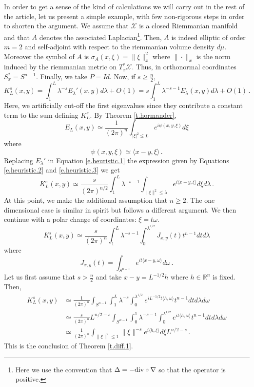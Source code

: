 \documentclass[10pt,twoside]{article}
\newcommand{\R}{\mathbb{R}}
\newcommand{\man}{\mathcal{X}}
\numberwithin{theorem}{section}
\begin{document}
In order to get a sense of the kind of calculations we will carry out in the rest of the article, let us present a simple example, with few non-rigorous steps in order to shorten the argument. We assume that $\man$ is a closed Riemmanian manifold and that $A$ denotes the associated Laplacian\footnote{Here we use the convention that $\Delta = -\textup{div}\circ\nabla$ so that the operator is positive.}. Then, $A$ is indeed elliptic of order $m=2$ and self-adjoint with respect to the riemmanian volume density $d\mu$. Moreover the symbol of $A$ is $\sigma_A(x,\xi) = \|\xi\|_x^2$ where $\|\cdot\|_x$ is the norm induced by the riemmanian metric on $T^*_x\man$. Thus, in orthonormal coordinates $S^*_x = S^{n-1}$. Finally, we take $P=Id$. Now, if $s\geq \frac{n}{2}$,
\begin{equation}\label{e.heuristic.1}
K^s_L(x,y)=\int_1^L \lambda^{-s} E_\lambda '(x,y)d\lambda + O(1)=s\int_1^L\lambda^{-s-1} E_\lambda(x,y)d\lambda+O(1)\, .
\end{equation}
Here, we artificially cut-off the first eigenvalues since they contribute a constant term to the sum defining $K^s_L$. By Theorem \ref{t.hormander},
\begin{equation}\label{e.heuristic.2}
E_L(x,y) \simeq \frac{1}{(2\pi)^n}\int_{|\xi|^2\leq L} e^{i\psi(x,y,\xi)} d\xi
\end{equation}
where
\begin{equation}\label{e.heuristic.3}
\psi(x,y,\xi)\simeq \langle x-y,\xi\rangle\, .
\end{equation}
Replacing $E_\lambda'$ in Equation \eqref{e.heuristic.1} the expression given by Equations \eqref{e.heuristic.2} and \eqref{e.heuristic.3} we get
\[
K^s_L(x,y)\simeq \frac{s}{(2\pi)^{n/2}}\int_1^L \lambda^{-s-1}\int_{\|\xi\|^2\leq \lambda}e^{i\langle x-y,\xi\rangle} d\xi d\lambda\, .
\]
At this point, we make the additional assumption that $n\geq 2$. The one dimensional case is similar in spirit but follows a different argument. We then continue with a polar change of coordinates: $\xi=t\omega$.
\begin{equation}\label{e.heuristic.4}
K^s_L(x,y)\simeq \frac{s}{(2\pi)^n}\int_1^L\lambda^{-s-1} \int_0^{\lambda^{1/2}}J_{x,y}(t) t^{n-1}dt d\lambda
\end{equation}
where
\[
J_{x,y}(t)=\int_{S^{n-1}} e^{it\langle x-y,\omega\rangle} d\omega\, .
\]
Let us first assume that $s>\frac{n}{2}$ and take $x-y = L^{-1/2}h$ where $h\in\R^n$ is fixed. Then,
\begin{align*}
K^s_L(x,y)&\simeq \frac{1}{(2\pi)^n}\int_{S^{n-1}} \int_1^L  \lambda^{-s} \int_0^{\lambda^{1/2}}  e^{i L^{-1/2}t \langle h,\omega \rangle}t^{n-1} dt d\lambda d\omega\\
&\simeq \frac{s}{(2\pi)^n}L^{n/2-s}\int_{S^{n-1}}\int_0^1 \lambda^{-s-1} \int_0^{\lambda^{1/2}} e^{it \langle h,\omega \rangle}t^{n-1}dt d\lambda d\omega\\
&\simeq\frac{1}{(2\pi)^n} \int_{\|\xi\|^2\leq 1} \|\xi\|^{-s} e^{i\langle h,\xi\rangle} d\xi L^{n/2-s}\, .
\end{align*}
This is the conclusion of Theorem \ref{t.diff.1}.\\
\end{document}
